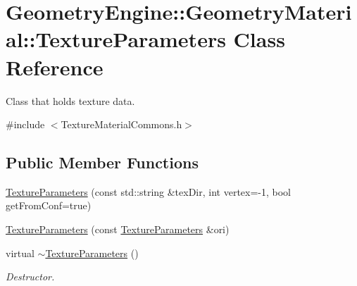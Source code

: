 \hypertarget{class_geometry_engine_1_1_geometry_material_1_1_texture_parameters}{}\section{Geometry\+Engine\+::Geometry\+Material\+::Texture\+Parameters Class Reference}
\label{class_geometry_engine_1_1_geometry_material_1_1_texture_parameters}


Class that holds texture data.  




{\ttfamily \#include $<$Texture\+Material\+Commons.\+h$>$}

\subsection*{Public Member Functions}
\begin{DoxyCompactItemize}
\item 
\mbox{\hyperlink{class_geometry_engine_1_1_geometry_material_1_1_texture_parameters_adad5f57ac5e9fc474ba2d5fa82439758}{Texture\+Parameters}} (const std\+::string \&tex\+Dir, int vertex=-\/1, bool get\+From\+Conf=true)
\item 
\mbox{\hyperlink{class_geometry_engine_1_1_geometry_material_1_1_texture_parameters_abbda2d6bc0bfc273cd8454acc8b326b7}{Texture\+Parameters}} (const \mbox{\hyperlink{class_geometry_engine_1_1_geometry_material_1_1_texture_parameters}{Texture\+Parameters}} \&ori)
\item 
\mbox{\label{class_geometry_engine_1_1_geometry_material_1_1_texture_parameters_a2ef598f10049c0d1a0c5aa2f2a56ffa3}} 
virtual \mbox{\hyperlink{class_geometry_engine_1_1_geometry_material_1_1_texture_parameters_a2ef598f10049c0d1a0c5aa2f2a56ffa3}{$\sim$\+Texture\+Parameters}} ()
\begin{DoxyCompactList}\small\item\em Destructor. \end{DoxyCompactList}\end{DoxyCompactItemize}
